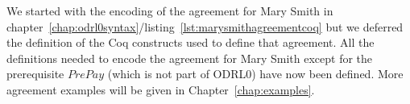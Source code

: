 We started with the encoding of the agreement for Mary Smith in chapter~\ref{chap:odrl0syntax}/listing~\ref{lst:marysmithagreementcoq} but we deferred the definition of the Coq constructs used to define that agreement. All the definitions needed to encode the agreement for Mary Smith except for the prerequisite $PrePay$ (which is not part of ODRL0) have now been defined. More agreement examples will be given in Chapter~\ref{chap:examples}.
